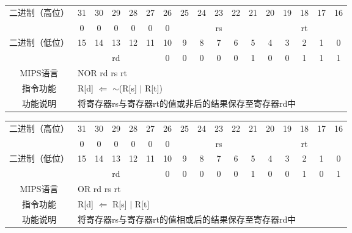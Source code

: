 \begin{table}
\begin{tabular}{|c|c|c|c|c|c|c|c|c|c|c|c|c|c|c|c|c|}
\hline
\multirow{2}{*}{二进制（高位）} &
31&30&29&28&27&26&25&24&23&22&21&20&19&18&17&16\\
\cline{2-17}
&
0&0&0&0&0&
0&
\multicolumn{5}{c|}{rs}&
\multicolumn{5}{c|}{rt}\\
\hline
\multirow{2}{*}{二进制（低位）} &
15&14&13&12&11&10&9&8&7&6&5&4&3&2&1&0\\
\cline{2-17}
&
\multicolumn{5}{c|}{rd}&
0&0&0&0&0&
1&0&0&1&1&
1\\
\hline
MIPS语言&
\multicolumn{16}{l|}{NOR rd rs rt}\\
\hline
指令功能&
\multicolumn{16}{l|}{R[d] $\Leftarrow$ $\sim$(R[s] $\mid$ R[t])}\\
\hline
功能说明&
\multicolumn{16}{l|}{将寄存器rs与寄存器rt的值或非后的结果保存至寄存器rd中}\\
\hline
\end{tabular}
\end{table}

\begin{table}
\begin{tabular}{|c|c|c|c|c|c|c|c|c|c|c|c|c|c|c|c|c|}
\hline
\multirow{2}{*}{二进制（高位）} &
31&30&29&28&27&26&25&24&23&22&21&20&19&18&17&16\\
\cline{2-17}
&
0&0&0&0&0&
0&
\multicolumn{5}{c|}{rs}&
\multicolumn{5}{c|}{rt}\\
\hline
\multirow{2}{*}{二进制（低位）} &
15&14&13&12&11&10&9&8&7&6&5&4&3&2&1&0\\
\cline{2-17}
&
\multicolumn{5}{c|}{rd}&
0&0&0&0&0&
1&0&0&1&0&
1\\
\hline
MIPS语言&
\multicolumn{16}{l|}{OR rd rs rt}\\
\hline
指令功能&
\multicolumn{16}{l|}{R[d] $\Leftarrow$ R[s] $\mid$ R[t]}\\
\hline
功能说明&
\multicolumn{16}{l|}{将寄存器rs与寄存器rt的值相或后的结果保存至寄存器rd中}\\
\hline
\end{tabular}
\end{table}

\clearpage

